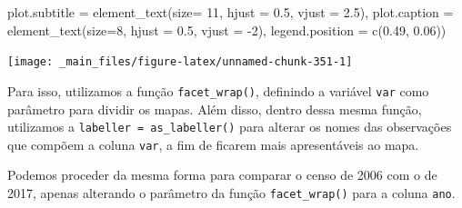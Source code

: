 \documentclass[
  brazilian,
]{book}
\newenvironment{Shaded}{\begin{snugshade}}{\end{snugshade}}
\newcommand{\AttributeTok}[1]{\textcolor[rgb]{0.77,0.63,0.00}{#1}}
\newcommand{\DecValTok}[1]{\textcolor[rgb]{0.00,0.00,0.81}{#1}}
\newcommand{\FloatTok}[1]{\textcolor[rgb]{0.00,0.00,0.81}{#1}}
\newcommand{\FunctionTok}[1]{\textcolor[rgb]{0.00,0.00,0.00}{#1}}
\newcommand{\NormalTok}[1]{#1}
\newcommand{\SpecialCharTok}[1]{\textcolor[rgb]{0.00,0.00,0.00}{#1}}
\begin{document}
\begin{Shaded}
\begin{Highlighting}[]
        \AttributeTok{plot.subtitle =} \FunctionTok{element\_text}\NormalTok{(}\AttributeTok{size=} \DecValTok{11}\NormalTok{, }\AttributeTok{hjust =} \FloatTok{0.5}\NormalTok{, }\AttributeTok{vjust =} \FloatTok{2.5}\NormalTok{),}
        \AttributeTok{plot.caption =} \FunctionTok{element\_text}\NormalTok{(}\AttributeTok{size=}\DecValTok{8}\NormalTok{, }\AttributeTok{hjust =} \FloatTok{0.5}\NormalTok{, }\AttributeTok{vjust =} \SpecialCharTok{{-}}\DecValTok{2}\NormalTok{),}
        \AttributeTok{legend.position =} \FunctionTok{c}\NormalTok{(}\FloatTok{0.49}\NormalTok{, }\FloatTok{0.06}\NormalTok{))}
\end{Highlighting}
\end{Shaded}

\begin{center}\texttt{[image: \_main\_files/figure-latex/unnamed-chunk-351-1]} \end{center}

Para isso, utilizamos a função \texttt{facet\_wrap()}, definindo a variável \texttt{var} como parâmetro para dividir os mapas. Além disso, dentro dessa mesma função, utilizamos a \texttt{labeller\ =\ as\_labeller()} para alterar os nomes das observações que compõem a coluna \texttt{var}, a fim de ficarem mais apresentáveis ao mapa.

Podemos proceder da mesma forma para comparar o censo de 2006 com o de 2017, apenas alterando o parâmetro da função \texttt{facet\_wrap()} para a coluna \texttt{ano}.
\end{document}
